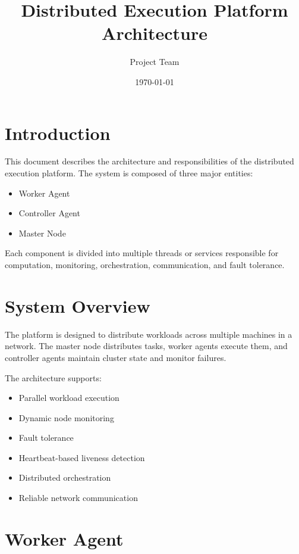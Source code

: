 \documentclass[12pt,a4paper]{article}
\title{Distributed Execution Platform Architecture}
\author{Project Team}
\date{\today}
\begin{document}
\maketitle

\tableofcontents
\newpage

\section{Introduction}

This document describes the architecture and responsibilities of the distributed execution platform. 
The system is composed of three major entities:

\begin{itemize}
    \item Worker Agent
    \item Controller Agent
    \item Master Node
\end{itemize}

Each component is divided into multiple threads or services responsible for computation, monitoring, orchestration, communication, and fault tolerance.

\section{System Overview}

The platform is designed to distribute workloads across multiple machines in a network. 
The master node distributes tasks, worker agents execute them, and controller agents maintain cluster state and monitor failures.

The architecture supports:

\begin{itemize}
    \item Parallel workload execution
    \item Dynamic node monitoring
    \item Fault tolerance
    \item Heartbeat-based liveness detection
    \item Distributed orchestration
    \item Reliable network communication
\end{itemize}

\newpage

\section{Worker Agent}
\end{document}
